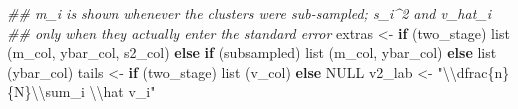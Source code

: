 \documentclass[
  letterpaper,
  DIV=11,
  numbers=noendperiod]{scrreprt}
\newenvironment{Shaded}{\begin{snugshade}}{\end{snugshade}}
\newcommand{\ConstantTok}[1]{\textcolor[rgb]{0.56,0.35,0.01}{#1}}
\newcommand{\ControlFlowTok}[1]{\textcolor[rgb]{0.00,0.23,0.31}{\textbf{#1}}}
\newcommand{\DocumentationTok}[1]{\textcolor[rgb]{0.37,0.37,0.37}{\textit{#1}}}
\newcommand{\FunctionTok}[1]{\textcolor[rgb]{0.28,0.35,0.67}{#1}}
\newcommand{\NormalTok}[1]{\textcolor[rgb]{0.00,0.23,0.31}{#1}}
\newcommand{\OtherTok}[1]{\textcolor[rgb]{0.00,0.23,0.31}{#1}}
\newcommand{\SpecialCharTok}[1]{\textcolor[rgb]{0.37,0.37,0.37}{#1}}
\newcommand{\StringTok}[1]{\textcolor[rgb]{0.13,0.47,0.30}{#1}}
\renewcommand{\[}{\begin{equation}}
\renewcommand{\]}{\end{equation}}
\begin{document}
\begin{Shaded}
\begin{Highlighting}[]
  \DocumentationTok{\#\# m\_i is shown whenever the clusters were sub{-}sampled; s\_i\^{}2 and v\_hat\_i}
  \DocumentationTok{\#\# only when they actually enter the standard error}
\NormalTok{  extras }\OtherTok{\textless{}{-}} \ControlFlowTok{if}\NormalTok{ (two\_stage) }\FunctionTok{list}\NormalTok{ (m\_col, ybar\_col, s2\_col)}
            \ControlFlowTok{else} \ControlFlowTok{if}\NormalTok{ (subsampled) }\FunctionTok{list}\NormalTok{ (m\_col, ybar\_col)}
            \ControlFlowTok{else} \FunctionTok{list}\NormalTok{ (ybar\_col)}
\NormalTok{  tails  }\OtherTok{\textless{}{-}} \ControlFlowTok{if}\NormalTok{ (two\_stage) }\FunctionTok{list}\NormalTok{ (v\_col) }\ControlFlowTok{else} \ConstantTok{NULL}
\NormalTok{  v2\_lab }\OtherTok{\textless{}{-}} \StringTok{"}\SpecialCharTok{\textbackslash{}\textbackslash{}}\StringTok{dfrac\{n\}\{N\}}\SpecialCharTok{\textbackslash{}\textbackslash{}}\StringTok{sum\_i }\SpecialCharTok{\textbackslash{}\textbackslash{}}\StringTok{hat v\_i"}


\end{Highlighting}
\end{Shaded}
\end{document}
